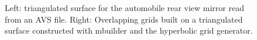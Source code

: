 {
\begin{figure}[hbt]
\newcommand{\figWidtha}{8cm}
\newcommand{\trimfig}[2]{\trimFigb{#1}{#2}{0}{.0}{.1}{.1}}
\begin{center}
\end{center}
\caption{Left: triangulated surface for the automobile rear view mirror read from an AVS file. Right: 
Overlapping grids built on a triangulated surface constructed with mbuilder and the hyperbolic
grid generator.}
\label{fig:retroGridsAVS}
\end{figure}
}
